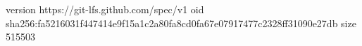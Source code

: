version https://git-lfs.github.com/spec/v1
oid sha256:fa5216031f447414e9f15a1c2a80fa8cd0fa67e07917477c2328ff31090e27db
size 515503
